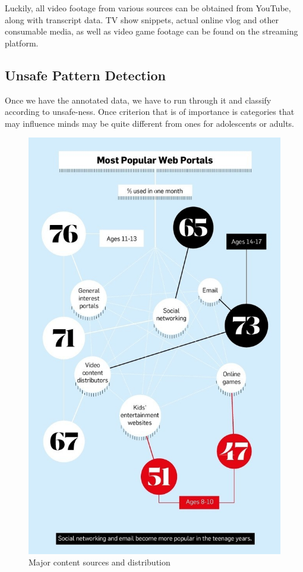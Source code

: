 \documentclass{article}
\begin{document}
Luckily, all video footage from various sources can be obtained from YouTube, along with transcript
data. TV show snippets, actual online vlog and other consumable media, as well as video game footage
can be found on the streaming platform.

\subsection{Unsafe Pattern Detection}

Once we have the annotated data, we have to run through it and classify according to unsafe-ness. Once
criterion that is of importance is categories that may influence minds may be quite different from ones
for adolescents or adults.

\begin{figure}
    \centering
    \includegraphics[scale=0.25]{graphic_stats.jpg}
    \caption{Major content sources and distribution}
    \label{fig:genre_dist}
\end{figure}
\end{document}
